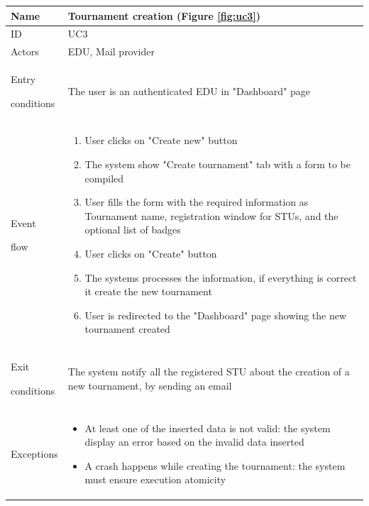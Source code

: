 \begin{center}
    \def\arraystretch{1.5}
    \begin{tabular}{| m{2cm} | m{10cm}|}
        \hline
        Name                  & Tournament creation  (Figure \ref{fig:uc3}) \\ \hline
        ID                    & UC3                                         \\ \hline
        Actors                & EDU, Mail provider                          \\ \hline
        Entry \par conditions & The user is an authenticated EDU in "Dashboard" page                                          \\ \hline
        Event \par flow       & \begin{enumerate}
                                    \item User clicks on "Create new" button
                                    \item The system show "Create tournament" tab with a form to be compiled
                                    \item User fills the form with the required information as Tournament name, registration window for STUs, and the optional list of badges
                                    \item User clicks on "Create" button
                                    \item The systems processes the information, if everything is correct it create the new tournament
                                    \item User is redirected to the "Dashboard" page showing the new tournament created
                                \end{enumerate}                            \\ \hline
        Exit \par conditions  & The system notify all the registered STU about the creation of a new tournament, by sending an email                                          \\ \hline
        Exceptions            & \begin{itemize}
                                    \item At least one of the inserted data is not valid: the system display an error based on the invalid data inserted 
                                    \item A crash happens while creating the tournament: the system must ensure execution atomicity
                                \end{itemize}                              \\ \hline
    \end{tabular}
\end{center}

